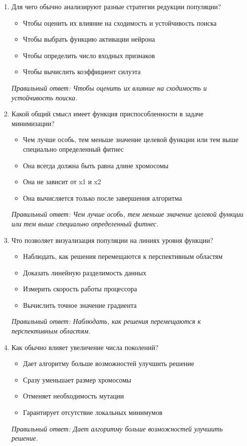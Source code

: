 \begin{enumerate}[label=\textbf{\arabic*.}, leftmargin=0pt, itemsep=1.2em]
\item Для чего обычно анализируют разные стратегии редукции популяции?
\begin{itemize}[label=$\square$, leftmargin=1.5cm, itemsep=0.2em, topsep=0.3em]
\item Чтобы оценить их влияние на сходимость и устойчивость поиска
\item Чтобы выбрать функцию активации нейрона
\item Чтобы определить число входных признаков
\item Чтобы вычислить коэффициент силуэта
\end{itemize}
{\small\textit{Правильный ответ: Чтобы оценить их влияние на сходимость и устойчивость поиска.}}

\item Какой общий смысл имеет функция приспособленности в задаче минимизации?
\begin{itemize}[label=$\square$, leftmargin=1.5cm, itemsep=0.2em, topsep=0.3em]
\item Чем лучше особь, тем меньше значение целевой функции или тем выше специально определенный фитнес
\item Она всегда должна быть равна длине хромосомы
\item Она не зависит от x1 и x2
\item Она вычисляется только после завершения алгоритма
\end{itemize}
{\small\textit{Правильный ответ: Чем лучше особь, тем меньше значение целевой функции или тем выше специально определенный фитнес.}}

\item Что позволяет визуализация популяции на линиях уровня функции?
\begin{itemize}[label=$\square$, leftmargin=1.5cm, itemsep=0.2em, topsep=0.3em]
\item Наблюдать, как решения перемещаются к перспективным областям
\item Доказать линейную разделимость данных
\item Измерить скорость работы процессора
\item Вычислить точное значение градиента
\end{itemize}
{\small\textit{Правильный ответ: Наблюдать, как решения перемещаются к перспективным областям.}}

\item Как обычно влияет увеличение числа поколений?
\begin{itemize}[label=$\square$, leftmargin=1.5cm, itemsep=0.2em, topsep=0.3em]
\item Дает алгоритму больше возможностей улучшить решение
\item Сразу уменьшает размер хромосомы
\item Отменяет необходимость мутации
\item Гарантирует отсутствие локальных минимумов
\end{itemize}
{\small\textit{Правильный ответ: Дает алгоритму больше возможностей улучшить решение.}}


\end{enumerate}
